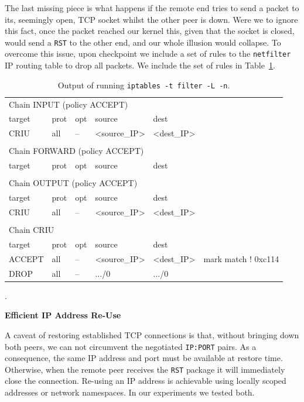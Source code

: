 The last missing piece is what happens if the remote end tries to send a packet to its, seemingly open, TCP socket whilst the other peer is down.
Were we to ignore this fact, once the packet reached our kernel this, given that the socket is closed, would send a \texttt{RST} to the other end, and our whole illusion would collapse.
To overcome this issue, upon checkpoint we include a set of rules to the \texttt{netfilter}~\cite{netfilter} IP routing table to drop all packets.
We include the set of rules in Table~\ref{table:iptables-rules}.
\begin{table}[h!]
    \centering
    {\ttfamily 
    \begin{tabular}{p{3cm}p{1cm}p{1cm}p{2.5cm}p{2.5cm}p{5.0cm}}
        \multicolumn{6}{l}{Chain INPUT (policy ACCEPT)} \\[3pt]
        target & prot & opt & source & dest & \\[3pt]
        CRIU & all & -- & <source\_IP> & <dest\_IP> & \\[3pt]
        & & & & & \\[3pt]
        \multicolumn{6}{l}{Chain FORWARD (policy ACCEPT)} \\[3pt]
        target & prot & opt & source & dest & \\[3pt]
        & & & & & \\[3pt]
        \multicolumn{6}{l}{Chain OUTPUT (policy ACCEPT)} \\[3pt]
        target & prot & opt & source & dest & \\[3pt]
        CRIU & all & -- & <source\_IP> & <dest\_IP> & \\[3pt]
        & & & & & \\[3pt]
        \multicolumn{6}{l}{Chain CRIU} \\[3pt]
        target & prot & opt & source & dest & \\[3pt]
        ACCEPT & all & -- & <source\_IP> & <dest\_IP> & mark match ! 0xc114\\[3pt]
        DROP & all & -- & .../0 & .../0 & \\[3pt]
    \end{tabular}
    }
    \caption{Output of running \texttt{iptables -t filter -L -n}.\label{table:iptables-rules}}.
\end{table}

\textbf{Efficient IP Address Re-Use}

A caveat of restoring established TCP connections is that, without bringing down both peers, we can not circumvent the negotiated \texttt{IP:PORT} pairs.
As a consequence, the same IP address and port must be available at restore time.
Otherwise, when the remote peer receives the \texttt{RST} package it will immediately close the connection.
Re-using an IP address is achievable using locally scoped addresses or network namespaces.
In our experiments we tested both.

